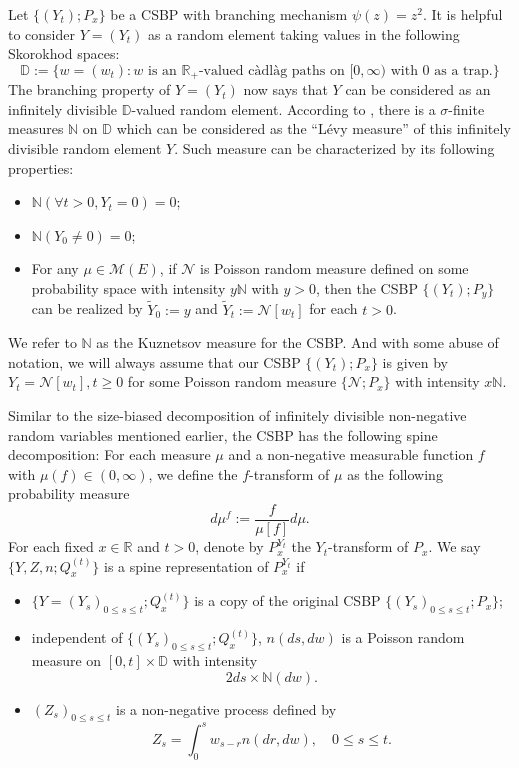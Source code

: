 \documentclass[UTF8]{pkuthss}
\theoremstyle{plain}
\theoremstyle{definition}
\numberwithin{equation}{section}
\begin{document}
	Let $\{(Y_t);P_x\}$ be a CSBP with branching mechanism $\psi(z)=z^2$.
It is helpful to consider $Y=(Y_t)$ as a random element taking values in the following Skorokhod spaces:
\[
\mathbb D:=\{w=(w_t): w \text{ is an $\mathbb R_+$-valued c\`adl\`ag paths on $[0,\infty)$ with $0$ as a trap.}\}
\]
	The branching property of $Y=(Y_t)$ now says that $Y$ can be considered as an infinitely divisible $\mathbb D$-valued random element. According to \cite{DynkinKuznetsov2004N-measure}, there is a $\sigma$-finite measures $\mathbb N$ on $\mathbb D$ which can be considered as the ``L\'evy measure'' of this infinitely divisible random element $Y$. Such measure can be characterized by its following properties:
\begin{itemize}
\item
 	$\mathbb N(\forall t>0, Y_t = 0) = 0$;
\item
	$\mathbb N(Y_0\neq 0)=0$;
\item
	For any $\mu\in \mathcal M(E)$, if $\mathcal N$ is Poisson random measure defined on some probability space with intensity $y\mathbb N$ with $y>0$, then the CSBP $\{(Y_t);P_y\}$ can be realized by $\tilde Y_0 := y$ and $\tilde Y_t:= \mathcal N[w_t]$ for each $t>0$.
\end{itemize}
	We refer to $\mathbb N$ as the Kuznetsov measure for the CSBP. 
	And with some abuse of notation, we will always assume that our CSBP $\{(Y_t); P_x\}$ is given by $Y_t = \mathcal N[w_t], t\geq 0$ for some Poisson random measure $\{\mathcal N;P_x\}$ with intensity $x\mathbb N$.

	Similar to the size-biased decomposition of infinitely divisible non-negative random variables mentioned earlier, the CSBP has the following spine decomposition:
	For each measure $\mu$ and a non-negative measurable function $f$ with $\mu(f) \in (0,\infty)$, we define the $f$-transform of $\mu$ as the following probability measure
\[
	d\mu^f:= \frac{f}{\mu[f]} d\mu.
\]
	For each fixed $x\in \mathbb R$ and $t>0$, denote by $P_x^{Y_t}$ the $Y_t$-transform of $P_x$. We say $\{Y,Z,n; Q^{(t)}_x\}$ is a spine representation of $P_x^{Y_t}$ if
\begin{itemize}
\item
	$\{Y=(Y_s)_{0\leq s\leq t}; Q^{(t)}_x\}$ is a copy of the original CSBP $\{(Y_s)_{0\leq s\leq t}; P_x\}$;
\item
	independent of $\{(Y_s)_{0\leq s\leq t}; Q_x^{(t)}\}$, $n(ds,dw)$ is a Poisson random measure on $[0,t]\times \mathbb D$ with intensity
\[
	2ds\times \mathbb N(dw).
\]
\item
	$(Z_s)_{0\leq s\leq t}$ is a non-negative process defined by
\begin{equation}
\label{eq: immigrates for classical spine decomposition for CSBP}
	Z_s = \int_0^s w_{s-r} n(dr,dw),\quad 0\leq s\leq t.
\end{equation}
\end{itemize}
\end{document}
